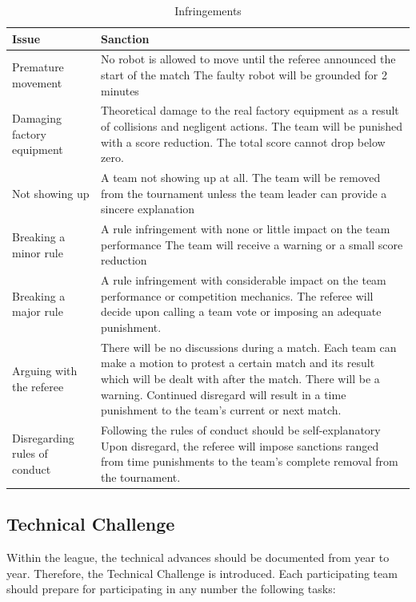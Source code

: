 \documentclass[12pt,twoside]{article}
\begin{document}
\begin{table}[thpb]
  \centering
  \begin{tabularx}{\linewidth}{l|X}
  \multicolumn{1}{l}{Issue} &\multicolumn{1}{l}{Sanction}\\\hline
  Premature movement & No robot is allowed to move until the referee
  announced the start of the match The faulty robot will be grounded
  for
  2 minutes\\[1ex]
%
  Damaging factory equipment & Theoretical damage to the real
  factory equipment as a result of collisions and negligent actions.
  The team will be punished with a score reduction. The total score
  cannot  drop below zero.\\[1ex]
%
  Not showing up & A team not showing up at all. The team will be
  removed from the tournament unless the team leader can provide a
  sincere explanation\\[1ex]
%
  Breaking a minor rule & A rule infringement with none or little
  impact on the team performance The team will receive a warning or a
  small  score reduction\\[1ex]
%
  Breaking a major rule & A rule infringement with considerable impact
  on the team performance or competition mechanics. The referee will
  decide upon calling a team vote or imposing an adequate punishment.\\[1ex]
%
  Arguing with the referee & There will be no discussions during a
  match. Each team can make a motion to protest a certain match and
  its result which will be dealt with after the match. There will be a
  warning. Continued disregard will result in a time punishment to the
  team's current or next match.\\[1ex]
%
  Disregarding rules of conduct & Following the rules of conduct
  should be self-explanatory Upon disregard, the referee will impose
  sanctions ranged from time punishments to the team's complete
  removal from the tournament.\\\hline
  \end{tabularx}  
  \caption{Infringements}
  \label{tab:infringements}
\end{table}



  \subsection{Technical Challenge}
  
  Within the league, the technical advances should be documented from
  year to year. Therefore, the Technical Challenge is introduced.
  Each participating team should prepare for participating in any
  number the following tasks:
\end{document}

